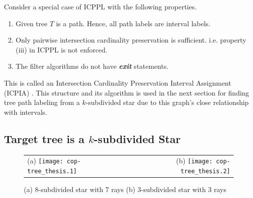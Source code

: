 \documentclass[MS]             %
              {iitmdiss_as}    %
\begin{document}
Consider a special case of ICPPL with the following properties.
\begin{enumerate}
\item Given tree $T$ is a path. Hence, all path labels are interval
  labels.
\item Only pairwise intersection cardinality preservation is
  sufficient. i.e. property (iii) in ICPPL is not enforced.
\item The filter algorithms do not have {\em \bf exit} statements.
\end{enumerate}
This is called an Intersection Cardinality Preservation Interval
Assignment (ICPIA) \cite{nsnrs09}. This structure and its algorithm is
used in the next section for finding tree path labeling from a
$k$-subdivided star due to this graph's close relationship with
intervals.

\subsection{Target tree is a $k$-subdivided Star}
\label{sec:ksubdivstar}

\begin{figure}[t] %
  \centering
  \begin{tabular}{lr}
    (a) \texttt{[image: cop-tree\_thesis.1]}&
    (b) \texttt{[image: cop-tree\_thesis.2]}
  \end{tabular}
  \caption{\figtabsize (a) $8$-subdivided star with 7 rays (b)
    3-subdivided star with 3 rays}
  \label{fig:kstar}
\end{figure}
\end{document}
